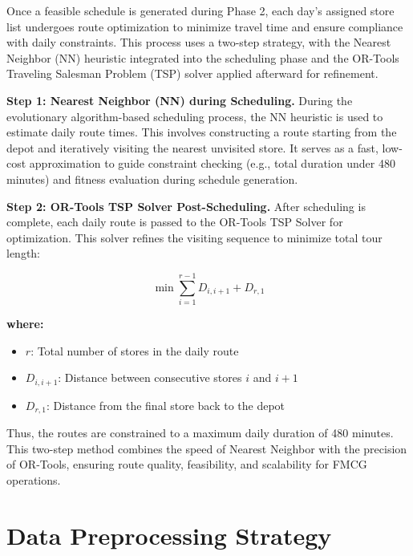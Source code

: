 Once a feasible schedule is generated during Phase 2, each day's assigned store list undergoes route optimization to minimize travel time and ensure compliance with daily constraints. This process uses a two-step strategy, with the Nearest Neighbor (NN) heuristic integrated into the scheduling phase and the OR-Tools Traveling Salesman Problem (TSP) solver applied afterward for refinement.

\textbf{Step 1: Nearest Neighbor (NN) during Scheduling.} During the evolutionary algorithm-based scheduling process, the NN heuristic is used to estimate daily route times. This involves constructing a route starting from the depot and iteratively visiting the nearest unvisited store. It serves as a fast, low-cost approximation to guide constraint checking (e.g., total duration under 480 minutes) and fitness evaluation during schedule generation.

\textbf{Step 2: OR-Tools TSP Solver Post-Scheduling.} After scheduling is complete, each daily route is passed to the OR-Tools TSP Solver for optimization. This solver refines the visiting sequence to minimize total tour length:

\[
\min \sum_{i=1}^{r-1} D_{i,i+1} + D_{r,1}
\]

\textbf{where:}
\begin{itemize}
  \item $r$: Total number of stores in the daily route
  \item $D_{i,i+1}$: Distance between consecutive stores $i$ and $i+1$
  \item $D_{r,1}$: Distance from the final store back to the depot
\end{itemize}

Thus, the routes are constrained to a maximum daily duration of 480 minutes. This two-step method combines the speed of Nearest Neighbor with the precision of OR-Tools, ensuring route quality, feasibility, and scalability for FMCG operations.
\section{Data Preprocessing Strategy}



